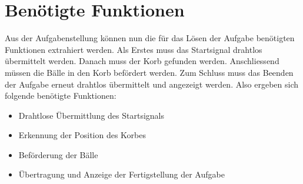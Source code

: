 \section{Benötigte Funktionen}
Aus der Aufgabenstellung können nun die für das Lösen der Aufgabe benötigten 
Funktionen extrahiert werden. Als Erstes muss das Startsignal drahtlos 
übermittelt werden. Danach muss der Korb gefunden werden. Anschliessend müssen 
die Bälle in den Korb befördert werden. Zum Schluss muss das Beenden der 
Aufgabe erneut drahtlos übermittelt und angezeigt werden. Also ergeben sich 
folgende benötigte Funktionen: 
\begin{itemize}
    \item Drahtlose Übermittlung des Startsignals
    \item Erkennung der Position des Korbes
    \item Beförderung der Bälle
    \item Übertragung und Anzeige der Fertigstellung der Aufgabe
\end{itemize}
